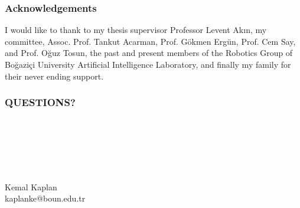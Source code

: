 \documentclass{beamer}
\newcommand{\mysectionpage}[2]{
	\begin{frame}
		\frametitle{#1}
		~\\~
		\begin{block}{}
			~\\~
			\begin{center}
				#2
			\end{center}
			~\\~
		\end{block}
	\end{frame}
}
\begin{document}
\begin{frame}
	\frametitle{Acknowledgements} 
	I would like to thank to my thesis supervisor Professor Levent Ak{\i}n, my committee, Assoc. Prof. Tankut Acarman, Prof. G\"okmen Erg\"un, Prof. Cem Say, and Prof. O\u{g}uz Tosun, the past and present members of the Robotics Group of  Bo{\u g}azi{\c c}i University Artificial Intelligence Laboratory, and finally my family for their never ending support.
\end{frame}	

\mysectionpage{QUESTIONS?}{Kemal Kaplan\\kaplanke@boun.edu.tr}
\end{document}
